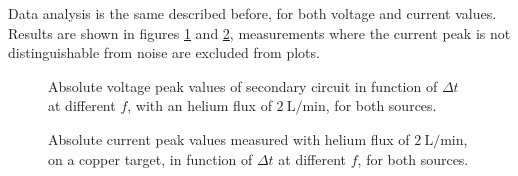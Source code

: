 Data analysis is the same described before, for both voltage and current values. Results are shown in figures \ref{fig:Vpp_gas} and \ref{fig:I_gas}, measurements where the current peak is not distinguishable from noise are excluded from plots.
\begin{figure}
 \centering
 \hfill
 \caption{Absolute voltage peak values of secondary circuit in function of $\Delta t$ at different $f$, with an helium flux of $\SI{2}{\liter/\minute}$, for both sources.}
 \label{fig:Vpp_gas}
\end{figure}

\begin{figure}
 \centering
 \hfill
 \caption{Absolute current peak values measured with helium flux of $\SI{2}{\liter/\minute}$, on a copper target, in function of $\Delta t$ at different $f$, for both sources.}
 \label{fig:I_gas}
\end{figure}


